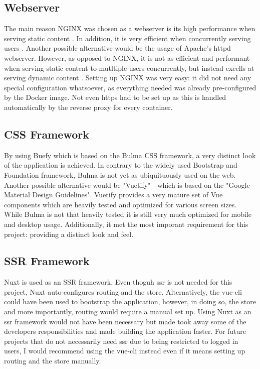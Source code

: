 \subsection{Webserver}
The main reason NGINX was chosen as a webserver is its high performance when serving static content \cite{NGINXvsApache:online}. In addition, it is very efficient when concurrently serving users \cite{NGINXvsApache:online}. Another possible alternative would be the usage of Apache's httpd webserver. However, as opposed to NGINX, it is not as efficient and performant when serving static content to mutltiple users concurrently, but instead excells at serving dynamic content \cite{NGINXvsApache:online}. Setting up NGINX was very easy: it did not need any special configuration whatsoever, as everything needed was already pre-configured by the Docker image. Not even https had to be set up as this is handled automatically by the reverse proxy for every container. 

\subsection{CSS Framework}
By using Buefy which is based on the Bulma CSS framework, a very distinct look of the application is achieved. In contrary to the widely used Bootstrap and Foundation framework, Bulma is not yet as ubiquituously used on the web. Another possible alternative would be "Vuetify" - which is based on the "Google Material Design Guidelines". Vuetify provides a very mature set of Vue components which are heavily tested and optimized for various screen sizes. While Bulma is not that heavily tested it is still very much optimized for mobile and desktop usage. Additionally, it met the most imporant requirement for this project: providing a distinct look and feel. 

\subsection{SSR Framework}
Nuxt is used as an SSR framework. Even thoguh \acrshort{ssr} is not needed for this project, Nuxt auto-configures routing and the store. Alternatively, the vue-cli could have been used to bootstrap the application, however, in doing so, the store and more importantly, routing would require a manual set up. Using Nuxt as an \acrshort{ssr} framework would not have been necessary but made took away some of the developers responsibilities and made building the application faster. For future projects that do not necessarily need \acrshort{ssr} due to being restricted to logged in users, I would recommend using the vue-cli instead even if it means setting up routing and the store manually. 

